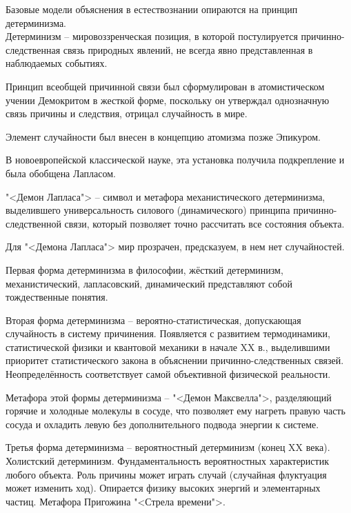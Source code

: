 \documentclass[exam_answers.tex]{subfiles}
\begin{document}
\renewcommand{\baselinestretch}{\blch}

Базовые модели объяснения в естествознании опираются на принцип детерминизма.\\

Детерминизм -- мировоззренческая позиция, в которой постулируется причинно-следственная связь природных явлений, не всегда явно представленная в наблюдаемых событиях.

Принцип всеобщей причинной связи был сформулирован в атомистическом учении Демокритом в жесткой форме,
поскольку он утверждал однозначную связь причины и следствия, отрицал случайность в мире.

Элемент случайности был внесен в концепцию атомизма позже Эпикуром.

В новоевропейской классической науке, эта установка получила подкрепление и была обобщена Лапласом.

"<Демон Лапласа"> -- символ и метафора механистического детерминизма, выделившего универсальность силового (динамического) принципа причинно-следственной связи, который позволяет точно рассчитать все состояния объекта.

Для "<Демона Лапласа"> мир прозрачен, предсказуем, в нем нет случайностей.

Первая форма детерминизма в философии, жёсткий детерминизм, механистический, лапласовский, динамический представляют собой тождественные понятия.

Вторая форма детерминизма -- вероятно-статистическая, допускающая случайность в систему причинения.
Появляется с развитием термодинамики, статистической физики и квантовой механики в начале XX в.,
выделившими приоритет статистического закона в объяснении причинно-следственных связей.
Неопределённость соответствует самой объективной физической реальности.

Метафора этой формы детерминизма – "<Демон Максвелла">, разделяющий горячие и холодные молекулы в сосуде,
что позволяет ему нагреть правую часть сосуда и охладить левую без дополнительного подвода энергии к системе.

Третья форма детерминизма -- вероятностный детерминизм (конец XX века).
Холистский детерминизм.
Фундаментальность вероятностных характеристик любого объекта.
Роль причины может играть случай (случайная флуктуация может изменить ход).
Опирается физику высоких энергий и элементарных частиц.
Метафора Пригожина "<Стрела времени">.
\end{document}
